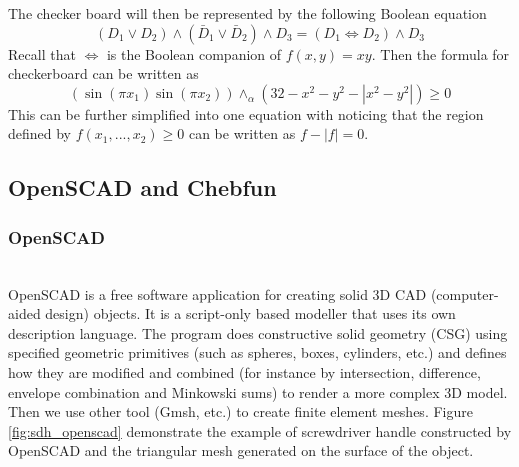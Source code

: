 \documentclass[11pt]{amsart}
\theoremstyle{definition}
\begin{document}
The checker board will then be represented by the following Boolean equation
$$(D_1\vee D_2)\wedge (\bar{D}_1\vee \bar{D}_2)\wedge D_3=(D_1\Leftrightarrow D_2)\wedge D_3$$
Recall that $\Leftrightarrow$ is the Boolean companion of $f(x,y)=xy$. Then the formula for checkerboard can be written as 
$$(\sin(\pi x_1)\sin(\pi x_2)) \wedge_\alpha (32-x^2-y^2-|x^2-y^2|) \geq 0$$
This can be further simplified into one equation with noticing that the region defined by $f(x_1,...,x_2)\geq 0$ can be written as $f-|f|= 0$.  

\subsection{OpenSCAD and Chebfun}
\subsubsection{OpenSCAD}~\\
OpenSCAD is a free software application for creating solid 3D CAD (computer-aided design) objects. It is a script-only based modeller that uses its own description language. The program does constructive solid geometry (CSG) using specified geometric primitives (such as spheres, boxes, cylinders, etc.) and defines how they are modified and combined (for instance by intersection, difference, envelope combination and Minkowski sums) to render a more complex 3D model. Then we use other tool (Gmsh, etc.) to create finite element meshes. Figure \ref{fig:sdh_openscad} demonstrate the example of screwdriver handle constructed by OpenSCAD and the triangular mesh generated on the surface of the object.
\end{document}
